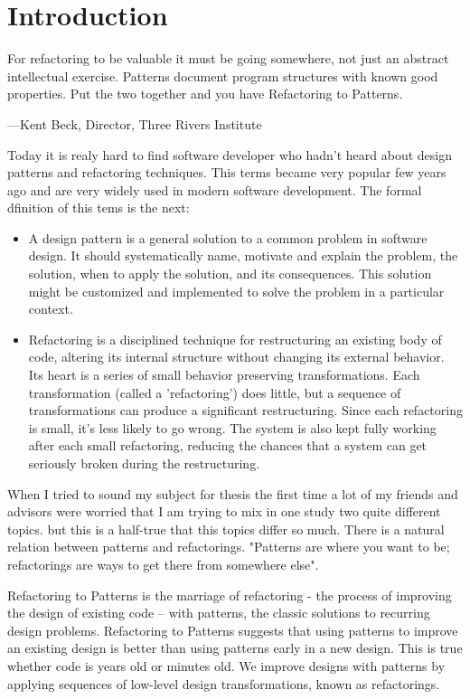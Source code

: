 \chapter{Introduction}
\label{chap:intro}

\begin{munquote}%
For refactoring to be valuable it must be going somewhere, not just an abstract intellectual exercise. Patterns document program structures with known good properties. Put the two together and you have Refactoring to Patterns.%
\end{munquote}
\hfill ---Kent Beck, Director, Three Rivers Institute

Today it is realy hard to find software developer who hadn't heard about design patterns and refactoring techniques.
This terms became very popular few years ago and are very widely used in modern software development.
The formal dfinition of this tems is the next:
\begin{itemize}
	\item A design pattern is a general solution to a common problem in software design. It should systematically name, motivate and explain the problem, the solution, when to apply the solution, and its consequences. This solution might be customized and implemented to solve the problem in a particular context.~\cite{res13}
	\item Refactoring is a disciplined technique for restructuring an existing body of code, altering its internal structure without changing its external behavior. Its heart is a series of small behavior preserving transformations. Each transformation (called a 'refactoring') does little, but a sequence of transformations can produce a significant restructuring. Since each refactoring is small, it's less likely to go wrong. The system is also kept fully working after each small refactoring, reducing the chances that a system can get seriously broken during the restructuring.~\cite{res14}
\end{itemize}

When I tried to sound my subject for thesis the first time a lot of my friends and advisors were worried that I am trying to mix in one study two quite different topics. but this is a half-true that this topics differ so much. There is a natural relation between patterns and refactorings. "Patterns are where you want to be; refactorings are ways to get there from somewhere else".~\cite{res11}

Refactoring to Patterns is the marriage of refactoring - the process of improving the design of existing code -- with patterns, the classic solutions to recurring design problems. Refactoring to Patterns suggests that using patterns to improve an existing design is better than using patterns early in a new design. This is true whether code is years old or minutes old. We improve designs with patterns by applying sequences of low-level design transformations, known as refactorings. 

